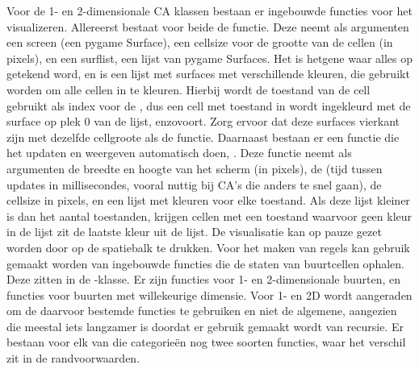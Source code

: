 {}\markdownRendererInterblockSeparator
{}\markdownRendererInterblockSeparator
{}Voor de 1- en 2-dimensionale CA klassen bestaan er ingebouwde functies voor het visualizeren.\markdownRendererInterblockSeparator
{}Allereerst bestaat voor beide de  functie. Deze neemt als argumenten een screen (een pygame Surface), een cellsize voor de grootte van de cellen (in pixels), en een surflist, een lijst van pygame Surfaces.\markdownRendererInterblockSeparator
{}Het  is hetgene waar alles op getekend word, en  is een lijst met surfaces met verschillende kleuren, die gebruikt worden om alle cellen in te kleuren. Hierbij wordt de toestand van de cell gebruikt als index voor de , dus een cell met toestand in wordt ingekleurd met de surface op plek 0 van de lijst, enzovoort. Zorg ervoor dat deze surfaces vierkant zijn met dezelfde cellgroote als de  functie.\markdownRendererInterblockSeparator
{}\markdownRendererInterblockSeparator
{}Daarnaast bestaan er een functie die het updaten en weergeven automatisch doen, . Deze functie neemt als argumenten de breedte en hoogte van het scherm (in pixels), de  (tijd tussen updates in millisecondes, vooral nuttig bij CA's die anders te snel gaan), de cellsize in pixels, en een lijst met kleuren voor elke toestand. Als deze lijst kleiner is dan het aantal toestanden, krijgen cellen met een toestand waarvoor geen kleur in de lijst zit de laatste kleur uit de lijst.\markdownRendererInterblockSeparator
{}De visualisatie kan op pauze gezet worden door op de spatiebalk te drukken.\markdownRendererInterblockSeparator
{}\markdownRendererInterblockSeparator
{}\markdownRendererInterblockSeparator
{}Voor het maken van regels kan gebruik gemaakt worden van ingebouwde functies die de staten van buurtcellen ophalen. Deze zitten in de -klasse. Er zijn functies voor 1- en 2-dimensionale buurten, en functies voor buurten met willekeurige dimensie. Voor 1- en 2D wordt aangeraden om de daarvoor bestemde functies te gebruiken en niet de algemene, aangezien die meestal iets langzamer is doordat er gebruik gemaakt wordt van recursie. Er bestaan voor elk van die categorieën nog twee soorten functies, waar het verschil zit in de randvoorwaarden.\markdownRendererInterblockSeparator
